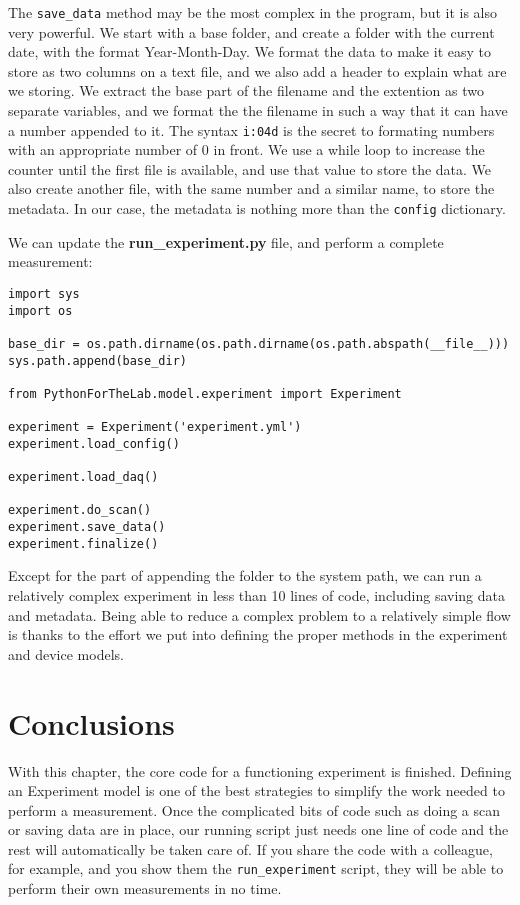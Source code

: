 {{{{The \texttt{save\_data} method may be the most complex in the program, but it is also very powerful. We start with a base folder, and create a folder with the current date, with the format Year-Month-Day. We format the data to make it easy to store as two columns on a text file, and we also add a header to explain what are we storing. We extract the base part of the filename and the extention as two separate variables, and we format the the filename in such a way that it can have a number appended to it. The syntax \texttt{i:04d} is the secret to formating numbers with an appropriate number of $0$ in front. We use a while loop to increase the counter until the first file is available, and use that value to store the data. We also create another file, with the same number and a similar name, to store the metadata. In our case, the metadata is nothing more than the \texttt{config} dictionary. 


We can update the \textbf{run\_experiment.py} file, and perform a complete measurement:

\begin{verbatim}
import sys
import os

base_dir = os.path.dirname(os.path.dirname(os.path.abspath(__file__)))
sys.path.append(base_dir)

from PythonForTheLab.model.experiment import Experiment

experiment = Experiment('experiment.yml')
experiment.load_config()

experiment.load_daq()

experiment.do_scan()
experiment.save_data()
experiment.finalize()
\end{verbatim}

Except for the part of appending the folder to the system path, we can run a relatively complex experiment in less than 10 lines of code, including saving data and metadata. Being able to reduce a complex problem to a relatively simple flow is thanks to the effort we put into defining the proper methods in the experiment and device models. 
 
\section{Conclusions}\label{experiment-model-conclusions}
With this chapter, the core code for a functioning experiment is finished. Defining an Experiment model is one of the best strategies to simplify the work needed to perform a measurement. Once the complicated bits of code such as doing a scan or saving data are in place, our running script just needs one line of code and the rest will automatically be taken care of. If you share the code with a colleague, for example, and you show them the \texttt{run\_experiment} script, they will be able to perform their own measurements in no time. 

}}}}
